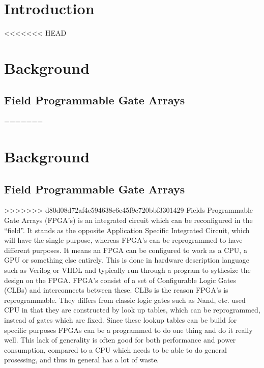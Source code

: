 \documentclass[a4paper]{article}
\date{}
\title{}
\begin{document}
\maketitle
\tableofcontents
\newpage
\section{Introduction}
<<<<<<< HEAD
\label{sec:orga581b9a}

\section{Background}
\label{sec:org70967f3}

\subsection{Field Programmable Gate Arrays}
\label{sec:org67248e5}
=======
\label{sec:orgf078114}

\section{Background}
\label{sec:org1a96be5}

\subsection{Field Programmable Gate Arrays}
\label{sec:org63df836}
>>>>>>> d80d08d72af4e594638c6e45f9c720bbf3301429
Fields Programmable Gate Arrays (FPGA's) is an integrated circuit which can be reconfigured in the ``field''. It stands as the opposite Application Specific Integrated Circuit, which will have the single purpose, whereas FPGA's can be reprogrammed to have different purposes. It means an FPGA can be configured to work as a CPU, a GPU or something else entirely. This is done in hardware description language such as Verilog or VHDL and typically run through a program to sythesize the design on the FPGA.
FPGA's consist of a set of Configurable Logic Gates (CLBs) and interconnects between these. CLBs is the reason FPGA's is reprogrammable. They differs from classic logic gates such as Nand, etc. used CPU in that they are constructed by look up tables, which can be reprogrammed, instead of gates which are fixed. Since these lookup tables can be build for specific purposes FPGAs can be a programmed to do one thing and do it really well. This lack of generality is often good for both performance and power consumption, compared to a CPU which needs to be able to do general prosessing, and thus in general has a lot of waste.
\end{document}
